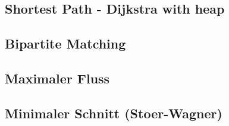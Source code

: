 %


%



%


%

\subsection{Shortest Path - Dijkstra with heap}


\subsection{Bipartite Matching}


\subsection{Maximaler Fluss}



\subsection{Minimaler Schnitt (Stoer-Wagner)}


